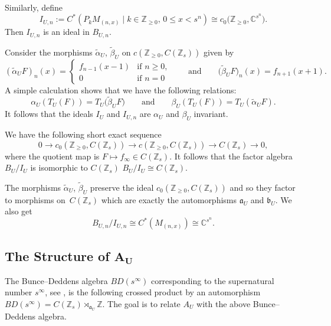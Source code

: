\documentclass[10pt,a4paper]{amsart}
\newcommand{\C}{{\mathbb C}}
\newcommand{\Z}{{\mathbb Z}}
\numberwithin{equation}{section}
\begin{document}
Similarly, define
\[
I_{U,n}:= C^*(P_kM_{(n,x)} \mid k\in \Z_{\ge 0}, \, 0\le x < s^n) \cong c_0\bigl(\Z_{\ge 0},\C^{s^n}\bigr).
\]
Then $I_{U,n}$ is an ideal in $B_{U,n}$.

Consider the morphisms $\tilde{\alpha}_U$, $\tilde{\beta}_U$ on $c(\Z_{\ge0}, C(\Z_s))$ given by
\begin{equation*}
(\tilde{\alpha}_UF)_n(x) =
\begin{cases}
f_{n-1}(x-1) &\textrm{if }n\ge0, \\
0 &\textrm{if }n=0
\end{cases}\qquad\text{and}\qquad \bigl(\tilde{\beta}_UF\bigr)_n(x) = f_{n+1}(x+1) .
\end{equation*}
A simple calculation shows that we have the following relations:
\begin{equation*}
\alpha_U(T_U(F))=T_U\bigl(\tilde{\beta}_UF\bigr)\qquad\text{and}\qquad \beta_U(T_U(F))=T_U(\tilde{\alpha}_UF) .
\end{equation*}
It follows that the ideals $I_U$ and $I_{U,n}$ are $\alpha_U$ and $\beta_U$ invariant.

We have the following short exact sequence
\begin{equation*}
0\to c_0(\Z_{\ge0}, C(\Z_s))\to c(\Z_{\ge0}, C(\Z_s))\to C(\Z_s)\to 0,
\end{equation*}
where the quotient map is $F\mapsto f_\infty\in C(\Z_s)$.
It follows that the factor algebra $B_U/I_U$ is isomorphic to $C(\Z_s)$
$
B_U/I_U\cong C(\Z_s)$.

The morphisms $\tilde{\alpha}_U$, $\tilde{\beta}_U$ preserve the ideal $c_0(\Z_{\ge0}, C(\Z_s))$ and so they factor to morphisms on~$C(\Z_s)$ which are exactly the automorphisms $\mathfrak{a}_U$ and $\mathfrak{b}_U$. We also get
\[
B_{U,n}/I_{U,n} \cong C^*(M_{(n,x)}) \cong \C^{s^n}.
\]

\subsection[The Structure of A\_U]{The Structure of $\boldsymbol{A_U}$}
The Bunce--Deddens algebra $BD(s^\infty)$ corresponding to the supernatural number $s^\infty$, see \cite{BD1,BD2,KMP2}, is the following crossed product by an automorphism
$BD(s^\infty) = C(\Z_s)\rtimes_{\mathfrak{a}_U}\Z $.
The goal is to relate $A_U$ with the above Bunce--Deddens algebra.
\end{document}
